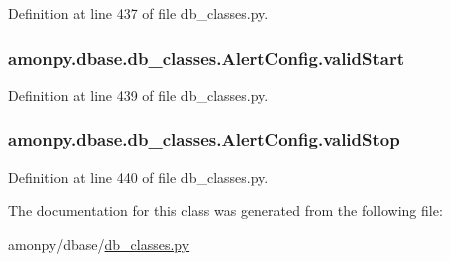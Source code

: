 Definition at line 437 of file db\-\_\-classes.\-py.

\hypertarget{classamonpy_1_1dbase_1_1db__classes_1_1_alert_config_ac4d6388204f392c5838eb2902a5cf263}{
\subsubsection[{valid\-Start}]{\setlength{\rightskip}{0pt plus 5cm}amonpy.\-dbase.\-db\-\_\-classes.\-Alert\-Config.\-valid\-Start}}\label{classamonpy_1_1dbase_1_1db__classes_1_1_alert_config_ac4d6388204f392c5838eb2902a5cf263}


Definition at line 439 of file db\-\_\-classes.\-py.

\hypertarget{classamonpy_1_1dbase_1_1db__classes_1_1_alert_config_af8bb43caa61b4c962ea2e96dc8722461}{
\subsubsection[{valid\-Stop}]{\setlength{\rightskip}{0pt plus 5cm}amonpy.\-dbase.\-db\-\_\-classes.\-Alert\-Config.\-valid\-Stop}}\label{classamonpy_1_1dbase_1_1db__classes_1_1_alert_config_af8bb43caa61b4c962ea2e96dc8722461}


Definition at line 440 of file db\-\_\-classes.\-py.



The documentation for this class was generated from the following file\-:\begin{DoxyCompactItemize}
\item 
amonpy/dbase/\hyperlink{db__classes_8py}{db\-\_\-classes.\-py}\end{DoxyCompactItemize}
